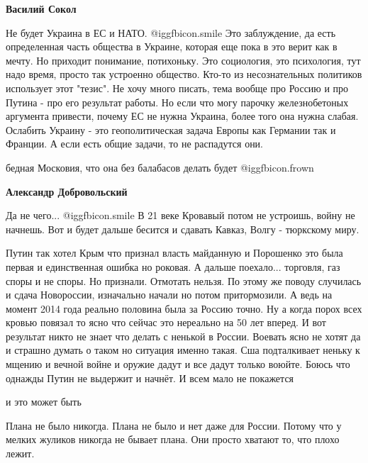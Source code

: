 \begin{itemize}
\begin{itemize}
\textbf{Василий Сокол} 

Не будет Украина в ЕС и НАТО.  @igg{fbicon.smile}  Это заблуждение, да есть
определенная часть общества в Украине, которая еще пока в это верит как в
мечту. Но приходит понимание, потихоньку. Это социология, это психология, тут
надо время, просто так устроенно общество. Кто-то из несознательных политиков
использует этот "тезис". Не хочу много писать, тема вообще про Россию и про
Путина - про его результат работы. Но если что могу парочку железнобетоных
аргумента привести, почему ЕС не нужна Украина, более того она нужна слабая.
Ослабить Украину - это геополитическая задача Европы как Германии так и
Франции. А если есть общие задачи, то не распадутся они.


бедная Московия, что она без балабасов делать будет  @igg{fbicon.frown} 

\textbf{Александр Добровольский} 

Да не чего...  @igg{fbicon.smile}  В 21 веке Кровавый потом не устроишь, войну не начнешь. Вот и
будет дальше бесится и сдавать Кавказ, Волгу - тюркскому миру.

\end{itemize} %


Путин так хотел Крым что признал власть майданную и Порошенко это была первая и
единственная ошибка но роковая. А дальше поехало... торговля, газ споры и не
споры. Но признали. Отмотать нельзя. По этому же поводу случилась и сдача
Новороссии, изначально начали но потом притормозили. А ведь на момент 2014 года
реально половина была за Россию точно. Ну а когда порох всех кровью повязал то
ясно что сейчас это нереально на 50 лет вперед. И вот результат никто не знает
что делать с ненькой в России. Воевать ясно не хотят да и страшно думать о
таком но ситуация именно такая. Сша подталкивает неньку к мщению и вечной войне
и оружие дадут и все дадут только воюйте. Боюсь что однажды Путин не выдержит и
начнёт. И всем мало не покажется

\begin{itemize} %
и это может быть
\end{itemize} %


Плана не было никогда. Плана не было и нет даже для России. Потому что у мелких
жуликов никогда не бывает плана. Они просто хватают то, что плохо лежит.


\end{itemize}
